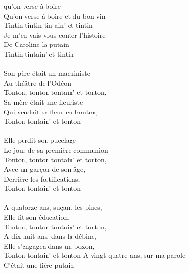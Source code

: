 
 qu'on verse à boire
\\Qu'on verse à boire et du bon vin
\\Tintin tintin tin ain' et tintin
\\Je m'en vais vous conter l'histoire
\\De Caroline la putain
\\Tintin tintain' et tintin
\\\\Son père était un machiniste
\\Au théâtre de l'Odéon
\\Tonton, tonton tontain' et tonton,
\\Sa mère était une fleuriste
\\Qui vendait sa fleur en bouton,
\\Tonton tontain' et tonton
\\\\Elle perdit son pucelage
\\Le jour de sa première communion
\\Tonton, tonton tontain' et tonton,
\\Avec un garçon de son âge,
\\Derrière les fortifications,
\\Tonton tontain' et tonton
\\\\A quatorze ans, suçant les pines,
\\Elle fit son éducation,
\\Tonton, tonton tontain' et tonton,
\\A dix-huit ans, dans la débine,
\\Elle s'engagea dans un boxon,
\\Tonton tontain' et tonton
\breakpage
A vingt-quatre ans, sur ma parole
\\C'était une fière putain
